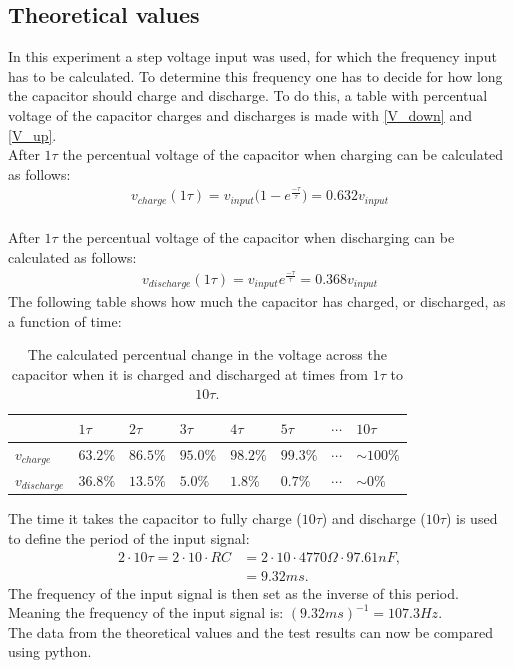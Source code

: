 \subsection{Theoretical values}
In this experiment a step voltage input was used, for which the frequency input has to be calculated. To determine this frequency one has to decide for how long the capacitor should charge and discharge. To do this, a table with percentual voltage of the capacitor charges and discharges is made with \eqref{V_down} and \eqref{V_up}.
\\
After $1\tau$ the percentual voltage of the capacitor when charging can be calculated as follows:
\begin{align*}
v_{charge}(1\tau)=v_{input}\bigg(1-e^{\frac{-\tau}{\tau}}\bigg )=0.632v_{input}
\end{align*}
\\
After $1\tau$ the percentual voltage of the capacitor when discharging can be calculated as follows:
\begin{align*}
v_{discharge}(1\tau)=v_{input}e^{\frac{-\tau}{\tau}}=0.368v_{input}
\end{align*}
The following table shows how much the capacitor has charged, or discharged, as a function of time:
\begin{table}[H]
\center
\begin{tabular}{|l|l|l|l|l|l|l|l|}
\hline
                & $1\tau$  & $2\tau$  & $3\tau$  & $4\tau$  & $5\tau$  & $\cdots$ & $10\tau$      \\ \hline
$v_{charge}$    & $63.2\%$ & $86.5\%$ & $95.0\%$ & $98.2\%$ & $99.3\%$ & $\cdots$ & $ \sim 100\%$ \\ \hline
$v_{discharge}$ & $36.8\%$ & $13.5\%$ & $5.0\%$  & $1.8\%$  & $0.7\%$  & $\cdots$ & $\sim 0\%$    \\ \hline
\end{tabular}
\caption{The calculated percentual change in the voltage across the capacitor when it is charged and discharged at times from $1\tau$ to $10\tau$.}
\end{table}
\noindent
The time it takes the capacitor to fully charge ($10\tau$) and discharge ($10\tau$) is used to define the period of the input signal:
\begin{align*}
2\cdot 10\tau=2\cdot 10 \cdot RC&=2\cdot 10 \cdot 4770\Omega \cdot 97.61 nF,
\\
&=9.32 ms.
\end{align*} 
The frequency of the input signal is then set as the inverse of this period. Meaning the frequency of the input signal is:  $(9.32ms)^{-1} = 107.3 Hz$.
\\
The data from the theoretical values and the test results can now be compared using python.
